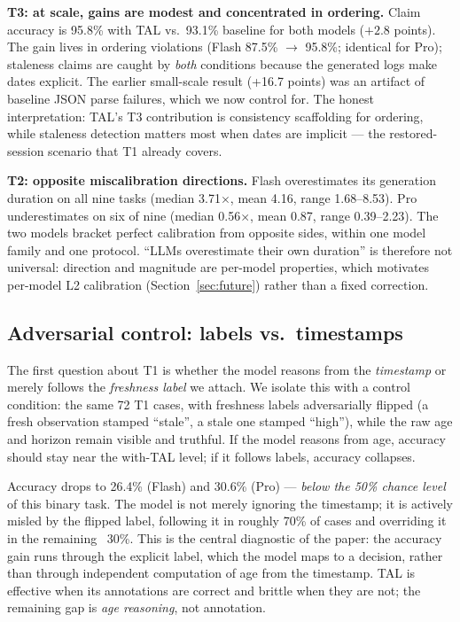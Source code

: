 \documentclass[10pt]{article}
\begin{document}
\textbf{T3: at scale, gains are modest and concentrated in ordering.} Claim
accuracy is 95.8\% with TAL vs.\ 93.1\% baseline for both models ($+2.8$ points).
The gain lives in ordering violations (Flash 87.5\% $\rightarrow$ 95.8\%; identical
for Pro); staleness claims are caught by \emph{both} conditions because the
generated logs make dates explicit. The earlier small-scale result (+16.7 points)
was an artifact of baseline JSON parse failures, which we now control for. The
honest interpretation: TAL's T3 contribution is consistency scaffolding for
ordering, while staleness detection matters most when dates are implicit --- the
restored-session scenario that T1 already covers.

\textbf{T2: opposite miscalibration directions.} Flash overestimates its generation
duration on all nine tasks (median 3.71$\times$, mean 4.16, range 1.68--8.53). Pro
underestimates on six of nine (median 0.56$\times$, mean 0.87, range 0.39--2.23).
The two models bracket perfect calibration from opposite sides, within one model
family and one protocol. ``LLMs overestimate their own duration'' is therefore not
universal: direction and magnitude are per-model properties, which motivates
per-model L2 calibration (Section~\ref{sec:future}) rather than a fixed correction.

\subsection{Adversarial control: labels vs.\ timestamps}
\label{sec:control}

The first question about T1 is whether the model reasons from the \emph{timestamp}
or merely follows the \emph{freshness label} we attach. We isolate this with a
control condition: the same 72 T1 cases, with freshness labels adversarially flipped
(a fresh observation stamped ``stale'', a stale one stamped ``high''), while the raw
age and horizon remain visible and truthful. If the model reasons from age, accuracy
should stay near the with-TAL level; if it follows labels, accuracy collapses.

Accuracy drops to 26.4\% (Flash) and 30.6\% (Pro) --- \emph{below the 50\% chance
level} of this binary task. The model is not merely ignoring the timestamp; it is
actively misled by the flipped label, following it in roughly 70\% of cases and
overriding it in the remaining ~30\%. This is the central diagnostic of the paper:
the accuracy gain runs through the explicit label, which the model maps to a
decision, rather than through independent computation of age from the timestamp.
TAL is effective when its annotations are correct and brittle when they are not;
the remaining gap is \emph{age reasoning}, not annotation.
\end{document}

